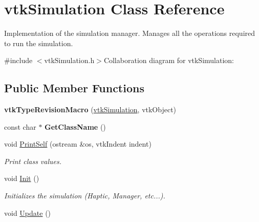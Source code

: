 \hypertarget{classvtkSimulation}{
\section{vtkSimulation Class Reference}
\label{classvtkSimulation}
}


Implementation of the simulation manager. Manages all the operations required to run the simulation.  


{\ttfamily \#include $<$vtkSimulation.h$>$}Collaboration diagram for vtkSimulation:\subsection*{Public Member Functions}
\begin{DoxyCompactItemize}
\item 
\hypertarget{classvtkSimulation_a8e06717c5dd8ce0adadd7b61ae366d50}{
{\bfseries vtkTypeRevisionMacro} (\hyperlink{classvtkSimulation}{vtkSimulation}, vtkObject)}
\label{classvtkSimulation_a8e06717c5dd8ce0adadd7b61ae366d50}

\item 
\hypertarget{classvtkSimulation_a7bb94f3b9a7e1f60048554726a1130b4}{
const char $\ast$ {\bfseries GetClassName} ()}
\label{classvtkSimulation_a7bb94f3b9a7e1f60048554726a1130b4}

\item 
\hypertarget{classvtkSimulation_a152b2ade8f62f1448bf16666fb3e91e0}{
void \hyperlink{classvtkSimulation_a152b2ade8f62f1448bf16666fb3e91e0}{PrintSelf} (ostream \&os, vtkIndent indent)}
\label{classvtkSimulation_a152b2ade8f62f1448bf16666fb3e91e0}

\begin{DoxyCompactList}\small\item\em Print class values. \item\end{DoxyCompactList}\item 
\hypertarget{classvtkSimulation_a386a0ef552396a6348a9aa0fa389a6ca}{
void \hyperlink{classvtkSimulation_a386a0ef552396a6348a9aa0fa389a6ca}{Init} ()}
\label{classvtkSimulation_a386a0ef552396a6348a9aa0fa389a6ca}

\begin{DoxyCompactList}\small\item\em Initializes the simulation (Haptic, Manager, etc...). \item\end{DoxyCompactList}\item 
\hypertarget{classvtkSimulation_accdfa33a6f7b3bfcff9fdb4f345f852e}{
void \hyperlink{classvtkSimulation_accdfa33a6f7b3bfcff9fdb4f345f852e}{Update} ()}
\label{classvtkSimulation_accdfa33a6f7b3bfcff9fdb4f345f852e}


\end{DoxyCompactItemize}
